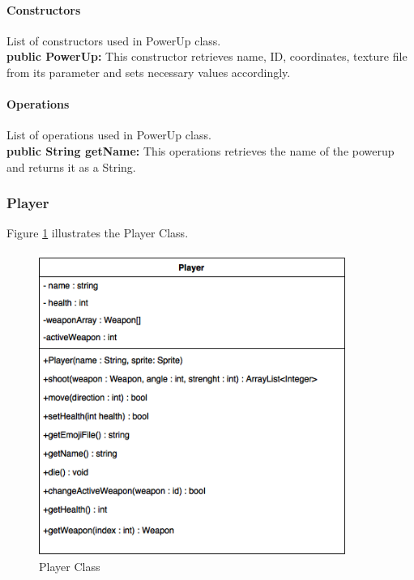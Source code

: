 \documentclass[12pt]{article} %
\begin{document}
\paragraph{Constructors \\}
List of constructors used in PowerUp class.\\
\textbf{public PowerUp:} This constructor retrieves name, ID, coordinates, texture file from its parameter and sets necessary values accordingly.

\paragraph{Operations \\}
List of operations used in PowerUp class.\\
\textbf{public String getName:} This operations retrieves the name of the powerup and returns it as a String.




\subsubsection{Player} %

Figure \ref{fig:player} illustrates the Player Class.
\begin{figure}[h!]
   \centering
   \vspace{10pt}%
   \includegraphics[width=10cm]{player.png}
   \caption{Player Class}
   \label{fig:player}
\end{figure}
\end{document}
